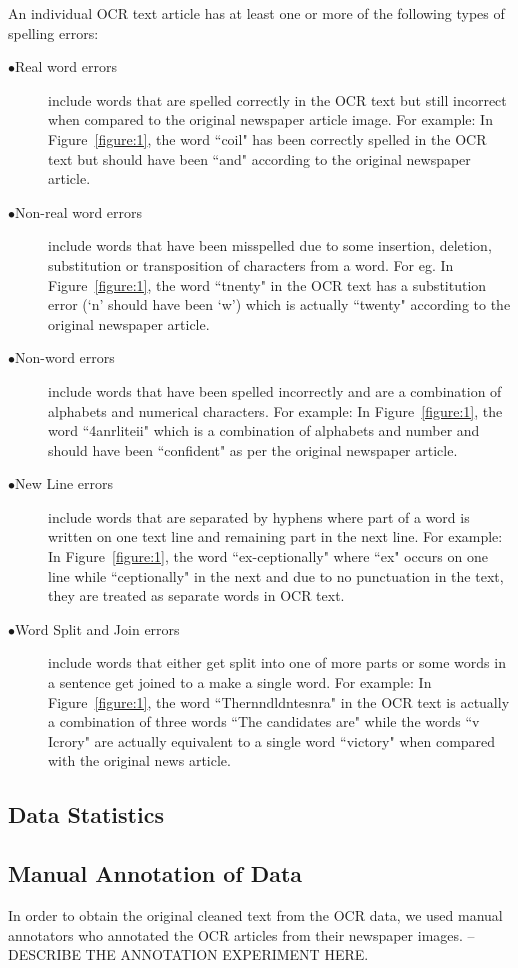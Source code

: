 \documentclass[preprint,11pt]{elsarticle}
\begin{document}
 An individual OCR text article has at least one or more of the following types of spelling errors:
\begin{description}
 \item[$\bullet$Real word errors] include words that are spelled correctly in the OCR text but still incorrect when compared to the original newspaper article image. For example: In Figure~\ref{figure:1}, the word ``coil"  has been correctly spelled in the OCR text  but should have been ``and" according to the original newspaper article. 
 \item[$\bullet$Non-real word errors] include words that have been misspelled due to some insertion, deletion, substitution or transposition of characters from a word. For eg. In Figure~\ref{figure:1}, the word ``tnenty" in the OCR text has a substitution error (`n' should have been `w') which is actually ``twenty" according to the original newspaper article.
 \item[$\bullet$Non-word errors] include words that have been spelled incorrectly and are a combination of alphabets and numerical characters. For example: In Figure~\ref{figure:1}, the word ``4anrliteii" which is a combination of alphabets and number and should have been ``confident" as per the original newspaper article.
\item[$\bullet$New Line errors] include words that are separated by hyphens where part of a word is written on one text line and remaining part in the next line. For example: In Figure~\ref{figure:1}, the word ``ex-ceptionally" where ``ex" occurs on one line while ``ceptionally" in the next and due to no punctuation in the text, they are treated as separate words in OCR text.
\item[$\bullet$Word Split and Join errors] include words that either get split into one of more parts or some words in a sentence get joined to a make a single word. For example: In Figure~\ref{figure:1}, the word ``Thernndldntesnra" in the OCR text is actually a combination of three words ``The candidates are" while the words ``v Icrory" are actually equivalent to a single word ``victory" when compared with the original news article.
\end{description} 

\subsection{Data Statistics}


\subsection{Manual Annotation of Data}
In order to obtain the original cleaned text from the OCR data, we used manual annotators who annotated the OCR articles from their newspaper images.
--DESCRIBE THE ANNOTATION EXPERIMENT HERE.
\end{document}

